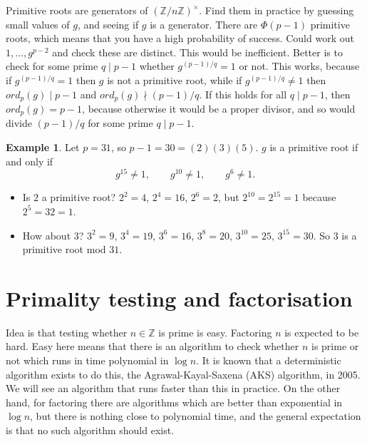 \documentclass{article}
\newcommand{\Z}{\mathbb{Z}}
\newcommand{\rb}[1]{\left( #1 \right)}
\newcommand{\unit}[1]{\rb{\Z / #1\Z}^\times}
\theoremstyle{definition}\newtheorem{definition}{Definition}
\theoremstyle{definition}\newtheorem{remark}[definition]{Remark}
\theoremstyle{definition}\newtheorem*{example}{Example}
\theoremstyle{definition}\newtheorem*{note}{Note}
\begin{document}

Primitive roots are generators of $ \unit{n} $. Find them in practice by guessing small values of $ g $, and seeing if $ g $ is a generator. There are $ \Phi\rb{p - 1} $ primitive roots, which means that you have a high probability of success. Could work out $ 1, \dots, g^{p - 2} $ and check these are distinct. This would be inefficient. Better is to check for some prime $ q \mid p - 1 $ whether $ g^{\rb{p - 1} / q} = 1 $ or not. This works, because if $ g^{\rb{p - 1} / q} = 1 $ then $ g $ is not a primitive root, while if $ g^{\rb{p - 1} / q} \ne 1 $ then $ ord_p\rb{g} \mid p - 1 $ and $ ord_p\rb{g} \nmid \rb{p - 1} / q $. If this holds for all $ q \mid p - 1 $, then $ ord_p\rb{g} = p - 1 $, because otherwise it would be a proper divisor, and so would divide $ \rb{p - 1} / q $ for some prime $ q \mid p - 1 $.

\begin{example}
Let $ p = 31 $, so $ p - 1 = 30 = \rb{2}\rb{3}\rb{5} $. $ g $ is a primitive root if and only if
$$ g^{15} \ne 1, \qquad g^{10} \ne 1, \qquad g^{6} \ne 1. $$
\begin{itemize}
\item Is $ 2 $ a primitive root? $ 2^2 = 4 $, $ 2^4 = 16 $, $ 2^6 = 2 $, but $ 2^{10} = 2^{15} = 1 $ because $ 2^5 = 32 = 1 $.
\item How about $ 3 $? $ 3^2 = 9 $, $ 3^4 = 19 $, $ 3^6 = 16 $, $ 3^8 = 20 $, $ 3^{10} = 25 $, $ 3^{15} = 30 $. So $ 3 $ is a primitive root mod $ 31 $.
\end{itemize}
\end{example}

\pagebreak

\section{Primality testing and factorisation}

Idea is that testing whether $ n \in \Z $ is prime is easy. Factoring $ n $ is expected to be hard. Easy here means that there is an algorithm to check whether $ n $ is prime or not which runs in time polynomial in $ \log n $. It is known that a deterministic algorithm exists to do this, the Agrawal-Kayal-Saxena (AKS) algorithm, in 2005. We will see an algorithm that runs faster than this in practice. On the other hand, for factoring there are algorithms which are better than exponential in $ \log n $, but there is nothing close to polynomial time, and the general expectation is that no such algorithm should exist.
\end{document}
